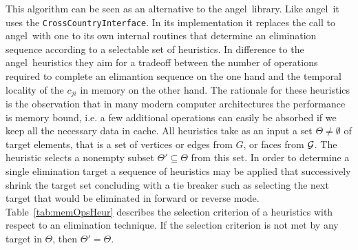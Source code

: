 \documentclass[11pt]{article}
\newcommand{\angel}{angel}
\newcommand{\code}[1]{{\small\tt{#1}}}
\newcommand{\reftab}[1]{{Table~\ref{#1}}}
\begin{document}
This algorithm can be seen as an alternative to the \angel\ library. 
Like \angel\ it uses the \code{CrossCountryInterface}. In its implementation 
it replaces the call to \angel\ with one to its own internal routines that
determine an elimination sequence according to a selectable set of heuristics. 
In difference to the \angel\ heuristics  they 
aim for a tradeoff between the number of operations required to complete an elimantion 
sequence on the one hand and the temporal locality of the $c_{ji}$ in memory on the other hand. 
The rationale for these heuristics is the observation that in many modern 
computer architectures the performance is memory bound, i.e. a few additional 
operations can easily be absorbed if we keep all the necessary data in cache. 
All heuristics take as an input a set $\Theta \neq \emptyset $ of target elements, that is 
a set of vertices or edges from $G$, or faces from $\cal G$. 
The heuristic selects a nonempty subset $\Theta'\subseteq \Theta $ from this set. 
In order to determine a single elimination target a sequence of heuristics may be applied 
that successively shrink the target set concluding with a tie breaker such as 
selecting the next target that would be eliminated in forward or reverse mode. 
\reftab{tab:memOpsHeur} describes the selection criterion of a heuristics with 
respect to an elimination technique.  If the selection criterion is not met 
by any target in $\Theta$, then $\Theta'=\Theta$. 
\end{document}
